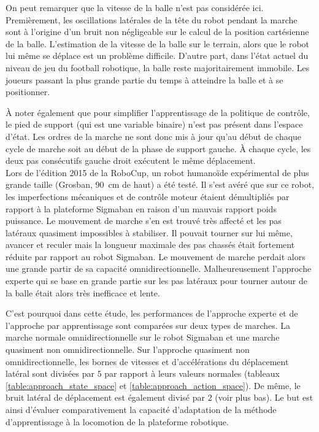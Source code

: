 On peut remarquer que la vitesse de la balle n'est pas considérée ici.
Premièrement, les oscillations latérales de la tête du robot pendant la marche
sont à l'origine d'un bruit non négligeable sur le calcul de la position cartésienne de la balle.
L'estimation de la vitesse de la balle sur le terrain, alors que le robot lui même se déplace
est un problème difficile.
D'autre part, dans l'état actuel du niveau de jeu du football robotique, 
la balle reste majoritairement immobile.
Les joueurs passant la plus grande partie du temps à atteindre 
la balle et à se positionner.

À noter également que pour simplifier l'apprentissage de la politique de contrôle, 
le pied de support (qui est une variable binaire) n'est pas présent dans l'espace d'état.
Les ordres de la marche ne sont donc mis à jour qu'au début de chaque cycle de marche soit
au début de la phase de support gauche. À chaque cycle, les deux pas consécutifs 
gauche droit exécutent le même déplacement.\\

Lors de l'édition 2015 de la RoboCup, un robot humanoïde expérimental 
de plus grande taille (Grosban, $90$~cm de haut) a été testé.
Il s'est avéré que sur ce robot, les imperfections mécaniques et de contrôle 
moteur étaient démultipliés par rapport à la plateforme Sigmaban en raison
d'un mauvais rapport poids puissance.
Le mouvement de marche s'en est trouvé très affecté et les pas latéraux
quasiment impossibles à stabiliser.
Il pouvait tourner sur lui même, avancer et reculer mais la longueur maximale des
pas chassés était fortement réduite par rapport au robot Sigmaban.
Le mouvement de marche perdait alors une grande partir de sa capacité omnidirectionnelle.
Malheureusement l'approche experte qui se base en grande partie sur les pas 
latéraux pour tourner autour de la balle était alors très inefficace et lente.

C'est pourquoi dans cette étude, les performances de l'approche experte et 
de l'approche par apprentissage sont comparées sur deux types de marches.
La marche normale omnidirectionnelle sur le robot Sigmaban et une
marche quasiment non omnidirectionnelle.
Sur l'approche quasiment non omnidirectionnelle, les bornes de vitesses et d'accélérations
du déplacement latéral sont divisées par $5$ par rapport à leurs valeurs normales
(tableaux \ref{table:approach_state_space} et \ref{table:approach_action_space}).
De même, le bruit latéral de déplacement est également divisé par $2$ (voir plus bas).
Le but est ainsi d'évaluer comparativement la capacité d'adaptation 
de la méthode d'apprentissage à la locomotion de la plateforme robotique.


